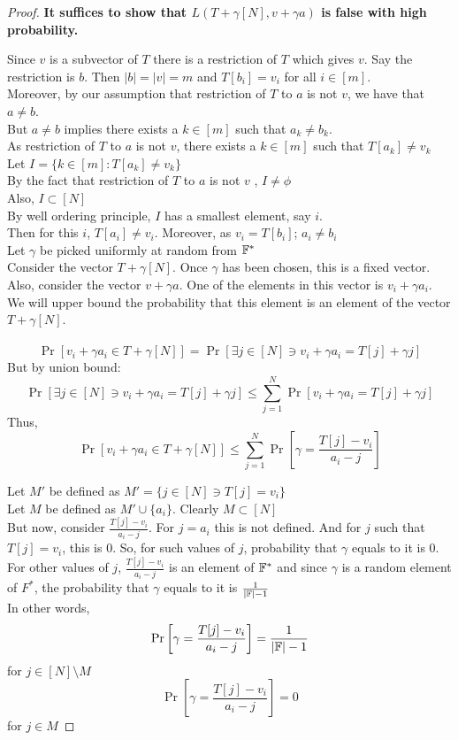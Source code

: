 \begin{proof}
    \textbf{It suffices to show that $L(T+\gamma[N], v+\gamma a)$ is false with high probability.}

    Since $v$ is a subvector of $T$ there is a restriction of $T$ which gives $v$. Say the restriction is $b$. Then $|b|=|v|=m$ and $T[b_i]=v_i$ for all $i \in [m]$. \\
    Moreover, by our assumption that restriction of $T$ to $a$ is not $v$, we have that $a \neq b$. \\
    But $a\neq b$ implies there exists a $k \in [m]$ such that $a_k\neq b_k$.\\
    As restriction of $T$ to $a$ is not $v$, there exists a $k \in [m]$ such that $T[a_k]\neq v_k$\\
    Let $I=\{k \in [m]: T[a_k]\neq v_k\}$\\
    By the fact that restriction of $T$ to $a$ is not $v$ , $I \neq \phi$\\
    Also, $I \subset [N]$\\
    By well ordering principle, $I$ has a smallest element, say $i$.\\
    Then for this $i$, $T[a_i]\neq v_i$. Moreover, as $v_i=T[b_i]$; $a_i \neq b_i$ \\
    Let $\gamma$ be picked uniformly at random from $\mathbb{F}^*$\\
    Consider the vector $T+\gamma[N]$. Once $\gamma$ has been chosen, this is a fixed vector. \\
    Also, consider the vector $v+\gamma a$. One of the elements in this vector is $v_i +\gamma a_i$.\\
    We will upper bound the probability that this element is an element of the vector $T+\gamma[N]$. \\\\
    $$\Pr[v_i +\gamma a_i \in T+\gamma[N]]=\Pr[\exists j \in [N] \ni v_i +\gamma a_i=T[j]+\gamma j]$$
    But by union bound:
    $$\Pr[\exists j \in [N] \ni v_i +\gamma a_i=T[j]+\gamma j] \leq \sum_{j=1}^N \Pr[v_i +\gamma a_i=T[j]+\gamma j]$$
    Thus,
    $$\Pr[v_i +\gamma a_i \in T+\gamma[N]] \leq \sum_{j=1}^N \Pr\left[\gamma = \frac{T[j]-v_i}{a_i-j}\right] $$

    Let $M'$ be defined as $M'=\{j\in [N] \ni T[j]=v_i \}$ \\
    Let $M$ be defined as $M' \cup \{a_i\}$. Clearly $M \subset [N]$\\
    But now, consider $\frac{T[j]-v_i}{a_i-j}$. For $j=a_i$ this is not defined. And for $j$ such that $T[j]=v_i$, this is 0. So, for such values of $j$, probability that $\gamma$ equals to it is $0$.\\
    For other values of $j$, $\frac{T[j]-v_i}{a_i-j}$ is an element of $\mathbb{F}^{*}$ and since $\gamma$ is a random element of $F^{*}$, the probability that $\gamma$ equals to it is $\frac{1}{|\mathbb{F}|-1}$\\
    In other words,
    $$\Pr\left[\gamma = \frac{T[j]-v_i}{a_i-j}\right]=\frac{1}{|\mathbb{F}|-1}$$ for $j \in [N]\setminus M$
    $$\Pr\left[\gamma = \frac{T[j]-v_i}{a_i-j}\right]=0$$ for $j \in M$


\end{proof}
